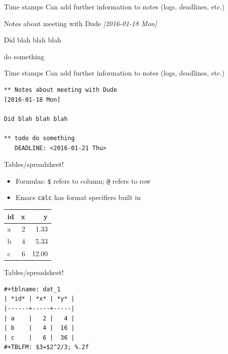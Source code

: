 \documentclass[aspectratio=169,presentation,bigger,fleqn,t]{beamer}
\begin{document}
\begin{frame}[label={sec:orgheadline11}]{Time stamps}
Can add further information to notes (logs, deadlines, etc.)

\begin{block}{Notes about meeting with Dude}
\textit{[2016-01-18 Mon]}

Did blah blah blah
\end{block}

\begin{block}{do something}
\end{block}
\end{frame}


\begin{frame}[fragile,label={sec:orgheadline12}]{Time stamps}
 Can add further information to notes (logs, deadlines, etc.)

\begin{verbatim}
** Notes about meeting with Dude
[2016-01-18 Mon]

Did blah blah blah

** todo do something
   DEADLINE: <2016-01-21 Thu>
\end{verbatim}
\end{frame}


\begin{frame}[fragile,label={sec:orgheadline13}]{Tables/spreadsheet!}
 \begin{itemize}
\item Formulas: \texttt{\$} refers to column; \texttt{@} refers to row
\item Emacs \texttt{calc} has format specifiers built in
\end{itemize}

\begin{center}
\label{tab:orgtable1}

\begin{tabular}{lrr}
\toprule
id & x & y\\
\midrule
a & 2 & 1.33\\
b & 4 & 5.33\\
c & 6 & 12.00\\
\bottomrule
\end{tabular}
\end{center}
\end{frame}

\begin{frame}[fragile,label={sec:orgheadline14}]{Tables/spreadsheet!}
 \begin{verbatim}
#+tblname: dat_1
| *id* | *x* | *y* |
|------+-----+-----|
| a    |   2 |   4 |
| b    |   4 |  16 |
| c    |   6 |  36 |
#+TBLFM: $3=$2^2/3; %.2f
\end{verbatim}
\end{frame}
\end{document}
